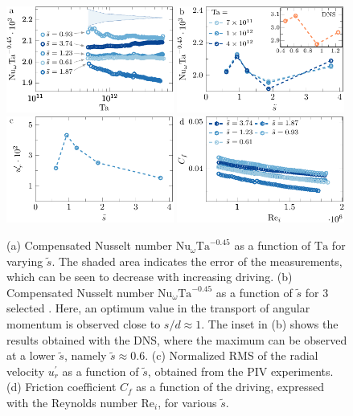 \begin{figure}
\centering
\includegraphics[width=0.49\textwidth]{fig8a_tanuw.pdf}
\includegraphics[width=0.49\textwidth]{fig8b_sdnuw.pdf}\\
\vspace{2mm}%
\includegraphics[width=0.49\textwidth]{fig8c.pdf}
\includegraphics[width=0.49\textwidth]{fig8d_sdcf.pdf}
\caption{(a) Compensated Nusselt number $\text{Nu}_\omega\text{Ta}^{-0.45}$ as a function of $\text{Ta}$ for varying $\tilde{s}$. The shaded area indicates the error of the measurements, which can be seen to decrease with increasing driving. (b) Compensated Nusselt number $\text{Nu}_\omega\text{Ta}^{-0.45}$ as a function of $\tilde{s}$ for 3 selected . Here, an optimum value in the transport of angular momentum is observed close to $s/d \approx 1$. The inset in (b) shows the results obtained with the DNS, where the maximum can be observed at a lower $\tilde{s}$, namely $\tilde{s}\approx 0.6$. (c) Normalized RMS of the radial velocity $u_r^\prime$ as a function of $\tilde{s}$, obtained from the PIV experiments. (d) Friction coefficient $C_f$ as a function of the driving, expressed with the Reynolds number $\text{Re}_i$, for various $\tilde{s}$.}
\label{fig:exptok}
\end{figure}

